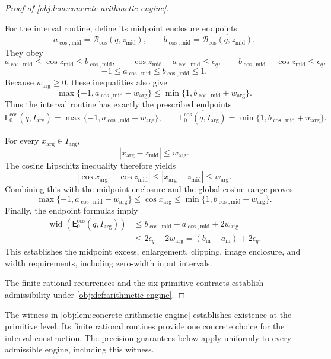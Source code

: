 \documentclass[11pt]{article}
\begin{document}
\begin{proof}[Proof of \cref{obj:lem:concrete-arithmetic-engine}]
\begin{enumerate}
For the interval routine, define its midpoint enclosure endpoints
\[
a_{\cos,\mathrm{mid}}
 =\underline{\mathcal B_{\cos}(q,z_{\mathrm{mid}})},
\qquad
b_{\cos,\mathrm{mid}}
 =\overline{\mathcal B_{\cos}(q,z_{\mathrm{mid}})}.
\]
They obey
\[
a_{\cos,\mathrm{mid}}\le\cos z_{\mathrm{mid}}
 \le b_{\cos,\mathrm{mid}},
\qquad
\cos z_{\mathrm{mid}}-a_{\cos,\mathrm{mid}}\le\epsilon_q,
\qquad
b_{\cos,\mathrm{mid}}-\cos z_{\mathrm{mid}}\le\epsilon_q,
\]
\[
-1\le a_{\cos,\mathrm{mid}}\le b_{\cos,\mathrm{mid}}\le1.
\]
Because \(w_{\mathrm{arg}}\ge0\), these inequalities also give
\[
\max\{-1,a_{\cos,\mathrm{mid}}-w_{\mathrm{arg}}\}
 \le
\min\{1,b_{\cos,\mathrm{mid}}+w_{\mathrm{arg}}\}.
\]
Thus the interval routine has exactly the prescribed endpoints
\[
\underline{\mathsf E_0^{\cos}(q,I_{\mathrm{arg}})}
 =\max\{-1,a_{\cos,\mathrm{mid}}-w_{\mathrm{arg}}\},
\qquad
\overline{\mathsf E_0^{\cos}(q,I_{\mathrm{arg}})}
 =\min\{1,b_{\cos,\mathrm{mid}}+w_{\mathrm{arg}}\}.
\]

For every \(x_{\mathrm{arg}}\in I_{\mathrm{arg}}\),
\[
|x_{\mathrm{arg}}-z_{\mathrm{mid}}|\le w_{\mathrm{arg}}.
\]
The cosine Lipschitz inequality therefore yields
\[
|\cos x_{\mathrm{arg}}-\cos z_{\mathrm{mid}}|
 \le|x_{\mathrm{arg}}-z_{\mathrm{mid}}|
 \le w_{\mathrm{arg}}.
\]
Combining this with the midpoint enclosure and the global cosine range proves
\[
\max\{-1,a_{\cos,\mathrm{mid}}-w_{\mathrm{arg}}\}
 \le\cos x_{\mathrm{arg}}
 \le\min\{1,b_{\cos,\mathrm{mid}}+w_{\mathrm{arg}}\}.
\]
Finally, the endpoint formulas imply
\[
\begin{split}
\operatorname{wid}(\mathsf E_0^{\cos}(q,I_{\mathrm{arg}}))
&\le b_{\cos,\mathrm{mid}}-a_{\cos,\mathrm{mid}}
       +2w_{\mathrm{arg}}\\
&\le2\epsilon_q+2w_{\mathrm{arg}}
 =(b_{\mathrm{in}}-a_{\mathrm{in}})+2\epsilon_q.
\end{split}
\]
This establishes the midpoint excess, enlargement, clipping, image enclosure, and width requirements, including zero-width input intervals.
\end{enumerate}

The finite rational recurrences and the six primitive contracts establish admissibility under \cref{obj:def:arithmetic-engine}.
\end{proof}

The witness in \cref{obj:lem:concrete-arithmetic-engine} establishes existence at the primitive level. Its finite rational routines provide one concrete choice for the interval construction. The precision guarantees below apply uniformly to every admissible engine, including this witness.
\end{document}
